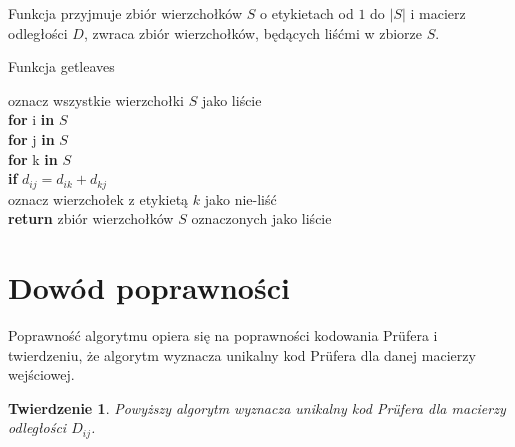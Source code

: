 \documentclass[a4paper,12p]{article}
\newcommand\tab[1][1cm]{\hspace*{#1}}
\begin{document}
Funkcja przyjmuje zbiór wierzchołków $S$ o etykietach od $1$ do $|S|$ i macierz odległości $D$, zwraca zbiór wierzchołków, będących liśćmi w zbiorze $S$.

\begin{algorithm}
		\caption{Funkcja getleaves}
		\label{algo}
		oznacz wszystkie wierzchołki $S$ jako liście \\
		\textbf{for} i \textbf{in} $S$ \\
		\tab \textbf{for} j \textbf{in} $S$ \\
		\tab \tab \textbf{for} k \textbf{in} $S$ \\
		\tab \tab \tab \textbf{if} $d_{ij} = d_{ik} + d_{kj}$ \\
		\tab \tab \tab \tab oznacz wierzchołek z etykietą $k$ jako nie-liść \\
		\textbf{return} zbiór wierzchołków $S$ oznaczonych jako liście \\
\end{algorithm}

\newpage

\section{Dowód poprawności}

Poprawność algorytmu opiera się na poprawności kodowania Prüfera i twierdzeniu, że algorytm wyznacza unikalny kod Prüfera dla danej macierzy wejściowej.

\newtheorem{lem}{Twierdzenie}

\begin{lem}
	Powyższy algorytm wyznacza unikalny kod Prüfera dla macierzy odległości $D_{ij}$.
\end{lem}
\end{document}
